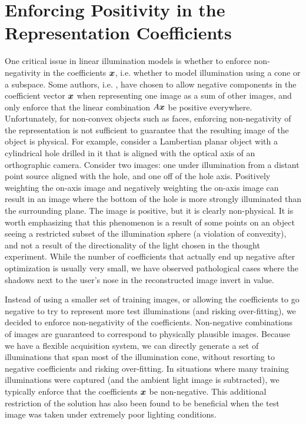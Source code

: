 \section{Enforcing Positivity in the Representation Coefficients} 
\label{sec:positivity}
One critical issue in linear illumination models
is whether to enforce non-negativity in the coefficients ${\boldsymbol{x}}$,
i.e. whether to model illumination using a cone or a subspace.
Some authors, i.e. \cite{Basri2003-PAMI}, have chosen to allow
negative components in the coefficient vector ${\boldsymbol{x}}$ when
representing one image as a sum of other images, and only
enforce that the linear combination $A{\boldsymbol{x}}$ be positive
everywhere.  Unfortunately, for non-convex objects such as
faces, enforcing non-negativity of the representation is not
sufficient to guarantee that the resulting image of the object
is physical.  For example, consider a Lambertian planar object
with a cylindrical hole drilled in it that is aligned with the
optical axis of an orthographic camera.  Consider two images:
one under illumination from a distant point source aligned with
the hole, and one off of the hole axis.  Positively weighting
the on-axis image and negatively weighting the on-axis image
can result in an image where the bottom of the hole is more
strongly illuminated than the surrounding plane.  The image is
positive, but it is clearly non-physical.  It is worth
emphasizing that this phenomenon is a result of some points on
an object seeing a restricted subset of the illumination sphere
(a violation of convexity),  and not a result of the
directionality of the light chosen in the thought experiment.
While the number of coefficients that actually end up negative
after optimization is usually very small, we have observed
pathological cases where the shadows next to the user's nose in
the reconstructed image invert in value.

Instead of using a smaller set of training images, or allowing the coefficients
to go negative to try to represent more test illuminations (and risking
over-fitting), we decided to enforce non-negativity of the coefficients.
Non-negative combinations of images are guaranteed to correspond to physically
plausible images.  Because we have a flexible acquisition system, we can
directly generate a set of illuminations that span most of the illumination
cone, without resorting to negative coefficients and risking over-fitting.  In
situations where many training illuminations were captured (and the ambient
light image is subtracted), we typically enforce that the coefficients ${\boldsymbol{x}}$ be
non-negative.  This additional restriction of the solution has also been found
to be beneficial when the test image was taken under extremely poor lighting
conditions.


